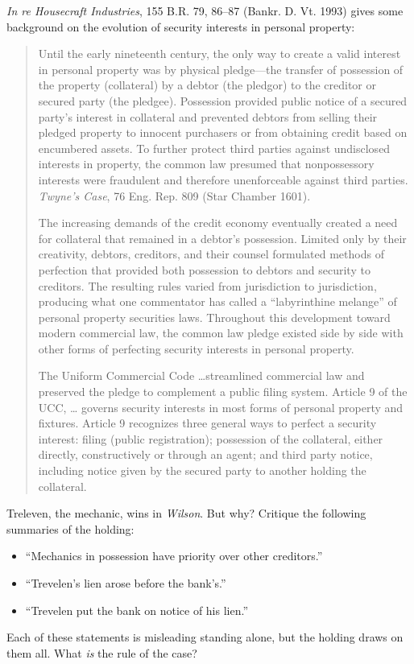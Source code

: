 
\item \textit{In re Housecraft Industries}, 155 B.R. 79, 86--87 (Bankr. D. Vt.
1993) gives some background on the evolution of security interests in personal
property:
\begin{quotation}
Until the early nineteenth century, the only way to create a valid interest in
personal property was by physical pledge---the transfer of possession of the
property (collateral) by a debtor (the pledgor) to the creditor or secured
party (the pledgee). Possession provided public notice of a secured party's
interest in collateral and prevented debtors from selling their pledged
property to innocent purchasers or from obtaining credit based on encumbered
assets. To further protect third parties against undisclosed interests in
property, the common law presumed that nonpossessory interests were fraudulent
and therefore unenforceable against third parties. \textit{Twyne's Case}, 76
Eng. Rep. 809 (Star Chamber 1601).

The increasing demands of the credit economy eventually created a need for
collateral that remained in a debtor's possession. Limited only by their
creativity, debtors, creditors, and their counsel formulated methods of
perfection that provided both possession to debtors and security to creditors.
The resulting rules varied from jurisdiction to jurisdiction, producing what
one commentator has called a ``labyrinthine melange'' of personal property
securities laws. Throughout this development toward modern commercial law, the
common law pledge existed side by side with other forms of perfecting security
interests in personal property.

The Uniform Commercial Code \ldots  streamlined commercial law and preserved
the pledge to complement a public filing system. Article 9 of the UCC, \ldots
governs security interests in most forms of personal property and fixtures.
Article 9 recognizes three general ways to perfect a security interest: filing
(public registration); possession of the collateral, either directly,
constructively or through an agent; and third party notice, including notice
given by the secured party to another holding the collateral.
\end{quotation}

\item Treleven, the mechanic, wins in \textit{Wilson}. But why? Critique the
following summaries of the holding:
\begin{itemize}
\item ``Mechanics in possession have priority over other creditors.''
\item ``Trevelen's lien arose before the bank's.''
\item ``Trevelen put the bank on notice of his lien.''
\end{itemize}
Each of these statements is misleading standing alone, but the holding draws on
them all. What \textit{is} the rule of the case?



